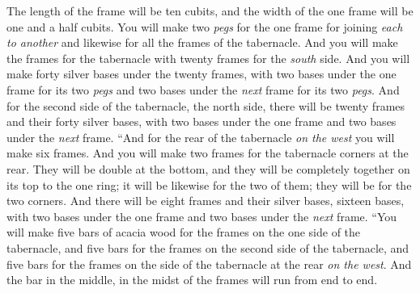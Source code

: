 \begin{biblechapter}
\verse The length of the frame will be ten cubits, and the width of the one frame will be one and a half cubits.
\verse You will make two \textit{pegs} for the one frame for joining \textit{each to another} and likewise for all the frames of the tabernacle.
\verse And you will make the frames for the tabernacle with twenty frames for the \textit{south} side.
\verse And you will make forty silver bases under the twenty frames, with two bases under the one frame for its two \textit{pegs} and two bases under the \textit{next} frame for its two \textit{pegs}.
\verse And for the second side of the tabernacle, the north side, there will be twenty frames
\verse and their forty silver bases, with two bases under the one frame and two bases under the \textit{next} frame.
\verse “And for the rear of the tabernacle \textit{on the west} you will make six frames.
\verse And you will make two frames for the tabernacle corners at the rear.
\verse They will be double at the bottom, and they will be completely together on its top to the one ring; it will be likewise for the two of them; they will be for the two corners.
\verse And there will be eight frames and their silver bases, sixteen bases, with two bases under the one frame and two bases under the \textit{next} frame.
\verse “You will make five bars of acacia wood for the frames on the one side of the tabernacle,
\verse and five bars for the frames on the second side of the tabernacle, and five bars for the frames on the side of the tabernacle at the rear \textit{on the west}.
\verse And the bar in the middle, in the midst of the frames will run from end to end.

\end{biblechapter}
